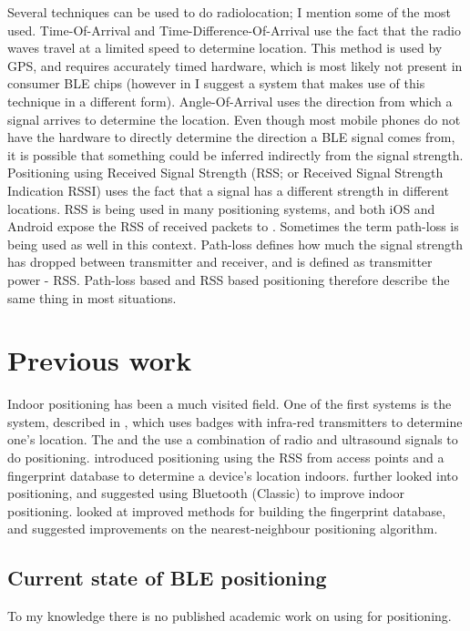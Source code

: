 Several techniques can be used to do radiolocation; I mention some of the most used.
Time-Of-Arrival and Time-Difference-Of-Arrival use the fact that the radio waves travel at a limited speed to determine location.
This method is used by GPS, and requires accurately timed hardware, which is most likely not present in consumer BLE chips (however in  I suggest a system that makes use of this technique in a different form).
Angle-Of-Arrival uses the direction from which a signal arrives to determine the location.
Even though most mobile phones do not have the hardware to directly determine the direction a BLE signal comes from, it is possible that something could be inferred indirectly from the signal strength.
Positioning using Received Signal Strength (RSS; or Received Signal Strength Indication RSSI) uses the fact that a signal has a different strength in different locations.
RSS is being used in many \wifi positioning systems, and both iOS and Android expose the RSS of received packets to \apps.
Sometimes the term path-loss is being used as well in this context.
Path-loss defines how much the signal strength has dropped between transmitter and receiver, and is defined as transmitter power - RSS.
Path-loss based and RSS based positioning therefore describe the same thing in most situations.

\section{Previous work}
Indoor positioning has been a much visited field.
One of the first systems is the  system, described in \citet{want1992active}, which uses badges with infra-red transmitters to determine one's location.
The \citep{harter2002anatomy} and the \citep{cricket} use a combination of radio and ultrasound signals to do positioning.
\citet{bahl2000radar} introduced \wifi positioning using the RSS from \wifi access points and a fingerprint database to determine a device's location indoors.
\citet{castro2001probabilistic} further looked into \wifi positioning, and \citet{pandya2003indoor} suggested using Bluetooth (Classic) to improve indoor positioning.
\citet{li2005method} looked at improved methods for building the fingerprint database, and \citet{shin2012enhanced} suggested improvements on the nearest-neighbour positioning algorithm.


\subsection{Current state of BLE positioning}
To my knowledge there is no published academic work on using \BLE for positioning.

